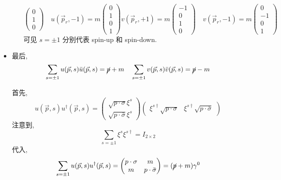 \begin{itemize}
\begin{itemize}
\begin{equation}
\begin{pmatrix}
				0 \\
				1 \\
				0
			\end{pmatrix} \quad u(\vec{p}_r, - 1) = m \begin{pmatrix}
				0 \\
				1 \\
				0 \\
				1
			\end{pmatrix} v(\vec{p}_r, + 1) = m \begin{pmatrix}
				- 1 \\
				0 \\
				1 \\
				0
			\end{pmatrix} \quad v(\vec{p}_r, - 1) = m \begin{pmatrix}
				0 \\
				- 1 \\
				0 \\
				1
			\end{pmatrix}
		\end{equation}
		可见 $s = \pm 1$ 分别代表 spin-up 和 spin-down.
	\end{itemize}
	
	\item 最后,
	\begin{equation}
		\sum_{s = \pm 1} u(\vec{p}, s) \bar{u}(\vec{p}, s) = \cancel{p} + m \quad \sum_{s = \pm 1} v(\vec{p}, s) \bar{v}(\vec{p}, s) = \cancel{p} - m
	\end{equation}
	
	\begin{tcolorbox}[title=calculation:]
		首先,
		\begin{equation}
			u(\vec{p}, s) u^\dag(\vec{p}, s) = \begin{pmatrix}
				\sqrt{p \cdot \sigma} \xi^s \\
				\sqrt{p \cdot \bar{\sigma}} \xi^s
			\end{pmatrix} \begin{pmatrix}
				\xi^{s \dag} \sqrt{p \cdot \sigma} & \xi^{s \dag} \sqrt{p \cdot \bar{\sigma}}
			\end{pmatrix}
		\end{equation}
		注意到,
		\begin{equation}
			\sum_{s = \pm 1} \xi^{s} \xi^{s \dag} = I_{2 \times 2}
		\end{equation}
		代入,
		\begin{equation}
			\sum_{s = \pm 1} u(\vec{p}, s) u^\dag(\vec{p}, s) = \begin{pmatrix}
				p \cdot \sigma & m \\
				m & p \cdot \bar{\sigma}
			\end{pmatrix} = (\cancel{p} + m) \gamma^0
		\end{equation}
		

\end{tcolorbox}
\end{itemize}
